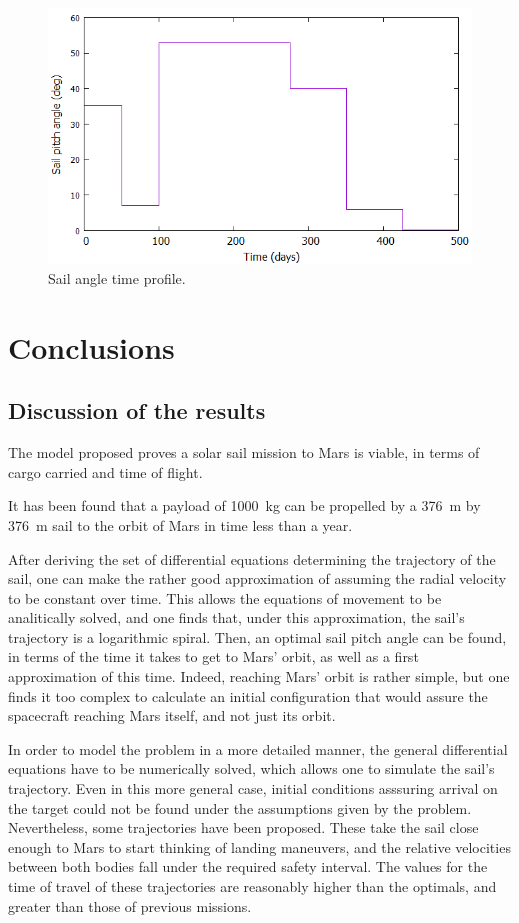 \documentclass[twocolumn,12pt,a4paper]{article}
\numberwithin{equation}{section}
\begin{document}
\begin{figure}
	\includegraphics[scale=0.35]{cocu.png}
	\caption{Sail angle time profile.}
	\label{fig:escaleta}
\end{figure}

\section{Conclusions}
\subsection{Discussion of the results}
The model proposed proves a solar sail mission to Mars is viable, in terms of cargo carried and time of flight.

It has been found that a payload of \SI{1000}{kg} can be propelled by a \SI{376}{m} by \SI{376}{m} sail to the orbit of Mars in time less than a year.

After deriving the set of differential equations determining the trajectory of the sail, one can make the rather good approximation of assuming the radial velocity to be constant over time. This allows the equations of movement to be analitically solved, and one finds that, under this approximation, the sail's trajectory is a logarithmic spiral. Then, an optimal sail pitch angle can be found, in terms of the time it takes to get to Mars' orbit, as well as a first approximation of this time. Indeed, reaching Mars' orbit is rather simple, but one finds it too complex to calculate an initial configuration that would assure the spacecraft reaching Mars itself, and not just its orbit.  

In order to model the problem in a more detailed manner, the general differential equations have to be numerically solved, which allows one to simulate the sail's trajectory. Even in this more general case, initial conditions asssuring arrival on the target could not be found under the assumptions given by the problem. Nevertheless, some trajectories have been proposed. These take the sail close enough to Mars to start thinking of landing maneuvers, and the relative velocities between both bodies fall under the required safety interval. The values for the time of travel of these trajectories are reasonably higher than the optimals, and greater than those of previous missions.
\end{document}
